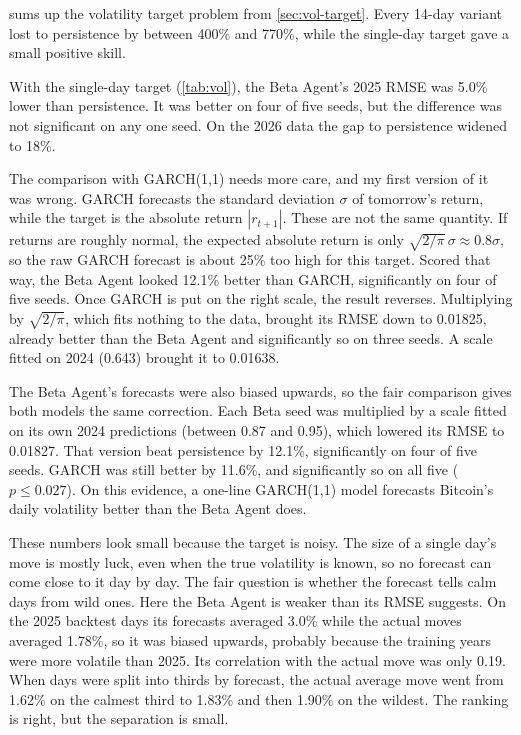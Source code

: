  sums up the volatility target problem from \cref{sec:vol-target}. Every 14-day variant lost to persistence by between 400\% and 770\%, while the single-day target gave a small positive skill.

With the single-day target (\cref{tab:vol}), the Beta Agent's 2025 RMSE was 5.0\% lower than persistence. It was better on four of five seeds, but the difference was not significant on any one seed. On the 2026 data the gap to persistence widened to 18\%.

The comparison with GARCH(1,1) needs more care, and my first version of it was wrong. GARCH forecasts the standard deviation $\sigma$ of tomorrow's return, while the target is the absolute return $|r_{t+1}|$. These are not the same quantity. If returns are roughly normal, the expected absolute return is only $\sqrt{2/\pi}\,\sigma \approx 0.8\sigma$, so the raw GARCH forecast is about 25\% too high for this target. Scored that way, the Beta Agent looked 12.1\% better than GARCH, significantly on four of five seeds. Once GARCH is put on the right scale, the result reverses. Multiplying by $\sqrt{2/\pi}$, which fits nothing to the data, brought its RMSE down to 0.01825, already better than the Beta Agent and significantly so on three seeds. A scale fitted on 2024 (0.643) brought it to 0.01638.

The Beta Agent's forecasts were also biased upwards, so the fair comparison gives both models the same correction. Each Beta seed was multiplied by a scale fitted on its own 2024 predictions (between 0.87 and 0.95), which lowered its RMSE to 0.01827. That version beat persistence by 12.1\%, significantly on four of five seeds. GARCH was still better by 11.6\%, and significantly so on all five ($p \le 0.027$). On this evidence, a one-line GARCH(1,1) model forecasts Bitcoin's daily volatility better than the Beta Agent does.

These numbers look small because the target is noisy. The size of a single day's move is mostly luck, even when the true volatility is known, so no forecast can come close to it day by day. The fair question is whether the forecast tells calm days from wild ones. Here the Beta Agent is weaker than its RMSE suggests. On the 2025 backtest days its forecasts averaged 3.0\% while the actual moves averaged 1.78\%, so it was biased upwards, probably because the training years were more volatile than 2025. Its correlation with the actual move was only 0.19. When days were split into thirds by forecast, the actual average move went from 1.62\% on the calmest third to 1.83\% and then 1.90\% on the wildest. The ranking is right, but the separation is small.

